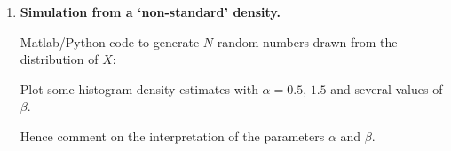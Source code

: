 \documentclass[12pt]{article}
\begin{document}
\begin{enumerate}
{\em Include your graphic here}
\vspace{3in}

\item {\bf Simulation from a `non-standard'  density.}

Matlab/Python code to generate $N$ random numbers drawn from the distribution of $X$:
\vspace{3in}

Plot some histogram density estimates with $\alpha=0.5,\,1.5$ and several values of $\beta$. 

\vspace{3in}

Hence comment on the interpretation of the parameters $\alpha$ and $\beta$.


\end{enumerate}
\end{document}

